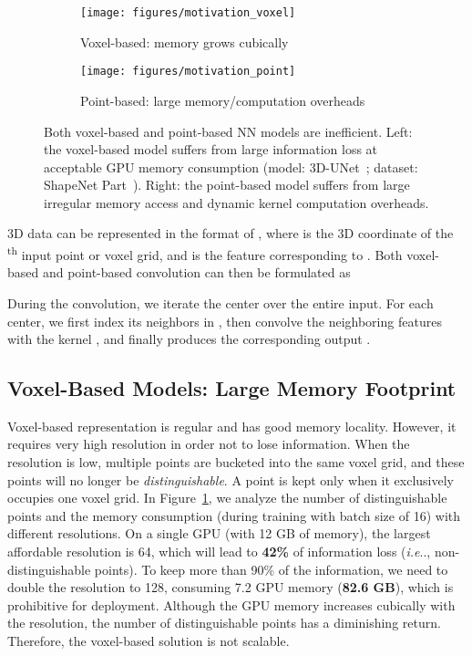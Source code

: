 \documentclass{article}
\makeatletter
\newcommand{\fig}[1]{Figure~\ref{#1}}
\DeclareRobustCommand\onedot{\futurelet\@let@token\@onedot}
\def\@onedot{\ifx\@let@token.\else.\null\fi\xspace}
\def\ie{\emph{i.e}\onedot} \def\Ie{\emph{I.e}\onedot}
\makeatother
\begin{document}
\begin{figure}[t]
\centering
\begin{subfigure}{0.485\textwidth}
    \centering
    \texttt{[image: figures/motivation\_voxel]}
    \caption{Voxel-based: memory grows cubically}
    \label{fig:motivation:a}
\end{subfigure}
\hfill
\begin{subfigure}{0.49\textwidth}
    \centering
    \texttt{[image: figures/motivation\_point]}
    \caption{Point-based: large memory/computation overheads}
    \label{fig:motivation:b}
\end{subfigure}
\caption{Both voxel-based and point-based NN models are inefficient. Left: the voxel-based model suffers from large information loss at acceptable GPU memory consumption (model: 3D-UNet~\cite{Cicek:2016un}; dataset: ShapeNet Part~\cite{Chang:2015sn}). Right: the point-based model suffers from large irregular memory access and dynamic kernel computation overheads.}
\vspace{-10pt}
\label{fig:motivation}
\end{figure}
 
3D data can be represented in the format of , where  is the 3D coordinate of the \textsuperscript{th} input point or voxel grid, and  is the feature corresponding to . Both voxel-based and point-based convolution can then be formulated as

During the convolution, we iterate the center  over the entire input. For each center, we first index its neighbors  in , then convolve the neighboring features  with the kernel , and finally produces the corresponding output .



\subsection{Voxel-Based Models: Large Memory Footprint}

Voxel-based representation is regular and has good memory locality. However, it requires very high resolution in order not to lose information. When the resolution is low, multiple points are bucketed into the same voxel grid, and these points will no longer be \emph{distinguishable}. A point is kept only when it exclusively occupies one voxel grid. In \fig{fig:motivation:a}, we analyze the number of distinguishable points and the memory consumption (during training with batch size of 16) with different resolutions. On a single GPU (with 12 GB of memory), the largest affordable resolution is 64, which will lead to \textbf{42\%} of information loss (\ie, non-distinguishable points). To keep more than 90\% of the information, we need to double the resolution to 128, consuming 7.2 GPU memory (\textbf{82.6 GB}), which is prohibitive for deployment. Although the GPU memory increases cubically with the resolution, the number of distinguishable points has a diminishing return. Therefore, the voxel-based solution is not scalable.
\end{document}
